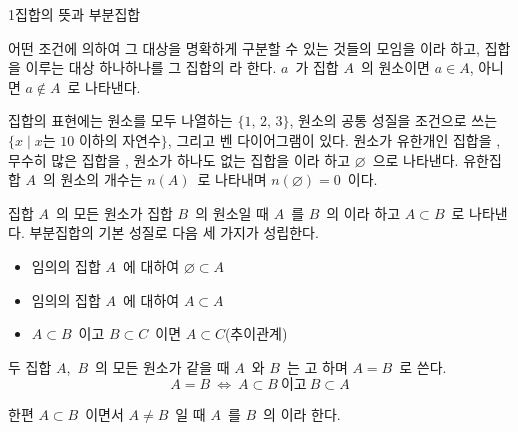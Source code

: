 \documentclass[10pt]{article}
\begin{document}

\begin{dmconcept}{1}{집합의 뜻과 부분집합}
\setlength{\parskip}{1.3mm plus 1.4mm minus 0mm}\linespread{1.20}\selectfont%


어떤 조건에 의하여 그 대상을 명확하게 구분할 수 있는 것들의 모임을 이라 하고, 집합을 이루는 대상 하나하나를 그 집합의 라 한다. $a$\ 가 집합 $A$\ 의 원소이면 $a \in A$, 아니면 $a \notin A$\ 로 나타낸다.

집합의 표현에는 원소를 모두 나열하는  $\{1,\, 2,\, 3\}$, 원소의 공통 성질을 조건으로 쓰는  $\{x \mid x \text{는 } 10 \text{ 이하의 자연수}\}$, 그리고 벤 다이어그램이 있다. 원소가 유한개인 집합을 , 무수히 많은 집합을 , 원소가 하나도 없는 집합을 이라 하고 $\varnothing$\ 으로 나타낸다. 유한집합 $A$\ 의 원소의 개수는 $n(A)$\ 로 나타내며 $n(\varnothing) = 0$\ 이다.


집합 $A$\ 의 모든 원소가 집합 $B$\ 의 원소일 때 $A$\ 를 $B$\ 의 이라 하고 $A \subset B$\ 로 나타낸다. 부분집합의 기본 성질로 다음 세 가지가 성립한다.
\begin{itemize}[leftmargin=8mm, itemsep=0.4mm, topsep=0.8mm]
  \item 임의의 집합 $A$\ 에 대하여 $\varnothing \subset A$
  \item 임의의 집합 $A$\ 에 대하여 $A \subset A$
  \item $A \subset B$\ 이고 $B \subset C$\ 이면 $A \subset C$\quad(추이관계)
\end{itemize}

두 집합 $A$,\ $B$\ 의 모든 원소가 같을 때 $A$\ 와 $B$\ 는 고 하며 $A = B$\ 로 쓴다.
\begin{equation*}
  A = B \ \Longleftrightarrow\ A \subset B \ \text{이고}\ B \subset A
\end{equation*}

한편 $A \subset B$\ 이면서 $A \ne B$\ 일 때 $A$\ 를 $B$\ 의 이라 한다.


\end{dmconcept}
\end{document}
